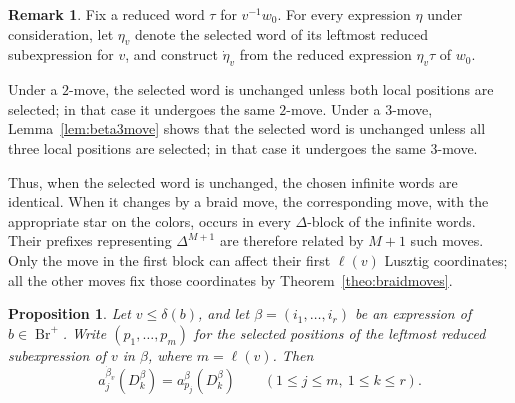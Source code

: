 \documentclass[12pt, reqno]{amsart}
\theoremstyle{plain}
\newtheorem{proposition}[theorem]{Proposition}
\theoremstyle{definition}
\newtheorem{remark}[theorem]{Remark}
\numberwithin{equation}{section}
\newcommand{\Br}{{\operatorname{Br}}}
\begin{document}
\begin{remark}\label{rem:dotbetamoves}
Fix a reduced word $\tau$ for $v^{-1}w_0$. For every expression $\eta$
under consideration, let $\eta_v$ denote the selected word of its
leftmost reduced subexpression for $v$, and construct $\dot\eta_v$
from the reduced expression $\eta_v\tau$ of $w_0$.

Under a $2$-move, the selected word is unchanged unless both local
positions are selected; in that case it undergoes the same $2$-move.
Under a $3$-move, Lemma~\ref{lem:beta3move} shows that the selected word
is unchanged unless all three local positions are selected; in that
case it undergoes the same $3$-move.

Thus, when the selected word is unchanged, the chosen infinite words
are identical. When it changes by a braid move, the corresponding
move, with the appropriate star on the colors, occurs in every
$\Delta$-block of the infinite words. Their prefixes representing
$\Delta^{M+1}$ are therefore related by $M+1$ such moves. Only the move
in the first block can affect their first $\ell(v)$ Lusztig
coordinates; all the other moves fix those coordinates by
Theorem~\ref{theo:braidmoves}.
\end{remark}


\begin{proposition}\label{pro:bfadotbeta}
Let $v\leq\delta(b)$, and let $\beta=(i_1,\ldots,i_r)$ be an expression
of $b\in\Br^+$. Write $(p_1,\ldots,p_m)$ for the selected positions of
the leftmost reduced subexpression of $v$ in $\beta$, where
$m=\ell(v)$. Then
\[
    a_j^{\dot\beta_v}(D_k^\beta)
    =a_{p_j}^{\beta}(D_k^\beta)
    \qquad(1\leq j\leq m,\ 1\leq k\leq r).
\]
\end{proposition}
\end{document}
